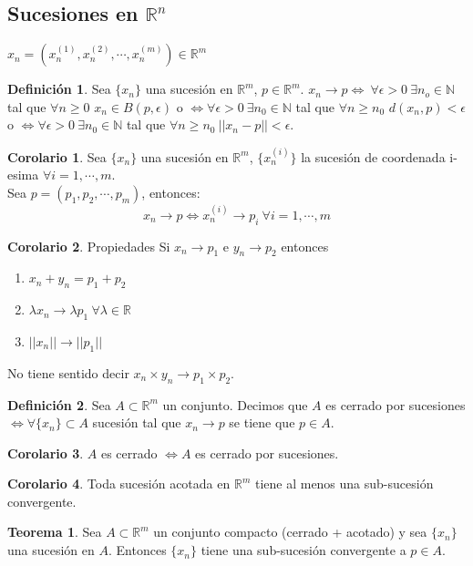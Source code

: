 \documentclass[10pt]{article}
\theoremstyle{definition}
\newtheorem{definition}{Definición}[section]
\newtheorem{theorem}{Teorema}[section]
\newtheorem{corollary}{Corolario}[theorem]
\begin{document}
\subsection{Sucesiones en $\mathbb{R}^n$}
$x_n=(x_n^{(1)},x_n^{(2)},\cdots,x_n^{(m)})\in\mathbb{R}^m$
\begin{definition}
    Sea $\{x_n\}$ una sucesión en $\mathbb{R}^m$, $p\in\mathbb{R}^m$. $x_n\to p \Leftrightarrow\ \forall\epsilon >0\ \exists n_o\in\mathbb{N}$ tal que $\forall n\ge 0$ $x_n\in B(p,\epsilon)$ o $\Leftrightarrow \forall\epsilon >0\ \exists n_0\in\mathbb{N}$ tal que $\forall n\ge n_0$ $d(x_n,p)<\epsilon$ o $\Leftrightarrow\forall\epsilon >0\ \exists n_0\in\mathbb{N}$ tal que $\forall n\ge n_0\ ||x_n-p||<\epsilon$.
\end{definition}
\begin{corollary}
    Sea $\{x_n\}$ una sucesión en $\mathbb{R}^m$, $\{x_n^{(i)}\}$ la sucesión de coordenada i-esima $\forall i=1,\cdots,m$.\\
    Sea $p=(p_1,p_2,\cdots,p_m)$, entonces:
    $$x_n\to p\Leftrightarrow x_n^{(i)}\to p_i\ \forall i=1,\cdots,m$$
\end{corollary}
\begin{corollary}{Propiedades}
        Si $x_n\to p_1$ e $y_n\to p_2$ entonces
        \begin{enumerate}
            \item $x_n+y_n=p_1+p_2$
            \item $\lambda x_n\to\lambda p_1\ \forall\lambda\in\mathbb{R}$
            \item $||x_n||\to ||p_1||$
        \end{enumerate}
        No tiene sentido decir $x_n\times y_n\to p_1\times p_2$.
\end{corollary}
\begin{definition}
    Sea $A\subset\mathbb{R}^m$ un conjunto. Decimos que $A$ es cerrado por sucesiones $\Leftrightarrow\forall\{x_n\}\subset A$ sucesión tal que $x_n\to p$ se tiene que $p\in A$.
\end{definition}
\begin{corollary}
    $A$ es cerrado $\Leftrightarrow A$ es cerrado por sucesiones.
\end{corollary}
\begin{corollary}
    Toda sucesión acotada en $\mathbb{R}^m$ tiene al menos una sub-sucesión convergente. 
\end{corollary}
\begin{theorem}
    Sea $A\subset\mathbb{R}^m$ un conjunto compacto (cerrado + acotado) y sea $\{x_n\}$ una sucesión en $A$. Entonces $\{x_n\}$ tiene una sub-sucesión convergente a $p\in A$.
\end{theorem}
\end{document}

